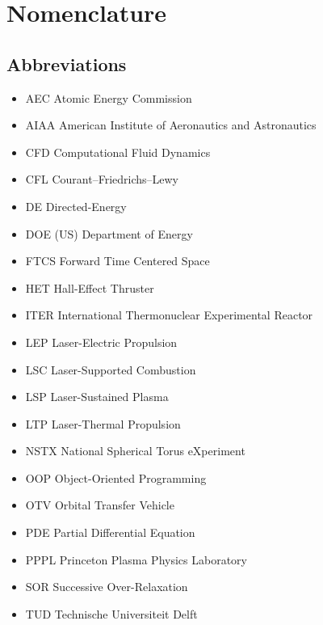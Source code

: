 \chapter*{Nomenclature}
\setlength{\columnsep}{1cm}
\newenvironment{nomtable}
    {
        \centering
        \tabularx{\columnwidth}{r>{\raggedright\arraybackslash}X}
    }
    {
        \endtabularx
    }
\newenvironment{nomlist}
    {
        \begin{itemize}[leftmargin=1.5cm]
            \raggedright
            \setlength{\parsep}{0pt}
            \setlength{\itemsep}{-4pt}
    }
    {
        \end{itemize}
    }
\begin{multicols*}{2}
    \section*{Abbreviations}

    \begin{nomlist}
        \item[AEC   ] Atomic Energy Commission
        \item[AIAA  ] American Institute of Aeronautics and Astronautics
        \item[CFD   ] Computational Fluid Dynamics
        \item[CFL   ] Courant--Friedrichs--Lewy
        \item[DE    ] Directed-Energy 
        \item[DOE   ] (US) Department of Energy
        \item[FTCS  ] Forward Time Centered Space
        \item[HET   ] Hall-Effect Thruster
        \item[ITER  ] International Thermonuclear Experimental Reactor
        \item[LEP   ] Laser-Electric Propulsion
        \item[LSC   ] Laser-Supported Combustion
        \item[LSP   ] Laser-Sustained Plasma
        \item[LTP   ] Laser-Thermal Propulsion
        \item[NSTX] National Spherical Torus eXperiment
        \item[OOP] Object-Oriented Programming
        \item[OTV]  Orbital Transfer Vehicle 
        \item[PDE] Partial Differential Equation
        \item[PPPL  ] Princeton Plasma Physics Laboratory
        \item[SOR   ] Successive Over-Relaxation
        \item[TUD   ] Technische Universiteit Delft
    \end{nomlist}


\end{multicols*}
